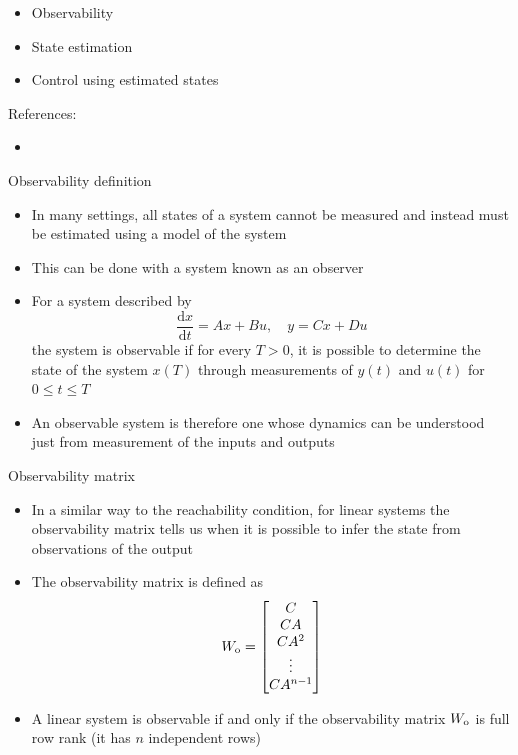\documentclass[10pt]{beamer-control}
\begin{document}

\begin{SUMMARY}
  \begin{itemize}
    \item Observability
    \item State estimation
    \item Control using estimated states
  \end{itemize}
  \vfill References:
  \begin{itemize}
    \item \astrom[§8.1–§8.3]
  \end{itemize}
\end{SUMMARY}



\begin{frame}{Observability definition}
  \begin{itemize}
    \item In many settings, all states of a system cannot be measured and instead must be estimated using a model of the system
    \item This can be done with a system known as an observer
    \item For a system described by
      \begin{equation}
        \frac{\mathrm{d}x}{\mathrm{d}t} = Ax+Bu, \quad y=Cx+Du
      \end{equation}
      the system is observable if for every $T>0$, it is possible to determine the state of the system $x(T)$ through measurements of $y(t)$ and $u(t)$ for $0\leq t \leq T$
    \item An observable system is therefore one whose dynamics can be understood just from measurement of the inputs and outputs
  \end{itemize}
\end{frame}

\begin{frame}{Observability matrix}
  \begin{itemize}
    \item In a similar way to the reachability condition, for linear systems the \alert{observability} matrix tells us when it is possible to infer the state from observations of the output
    \item The observability matrix is defined as
      \begin{equation}
        W_{\mathrm{o}} = \begin{bmatrix}
          C \\ CA \\ CA^2 \\ \vdots \\ CA^{n-1}
        \end{bmatrix}
      \end{equation}
    \item A linear system is \alert{observable} if and only if the observability matrix $W_{\mathrm{o}}$ is full row rank (it has $n$ independent rows)
  \end{itemize}
\end{frame}
\end{document}
